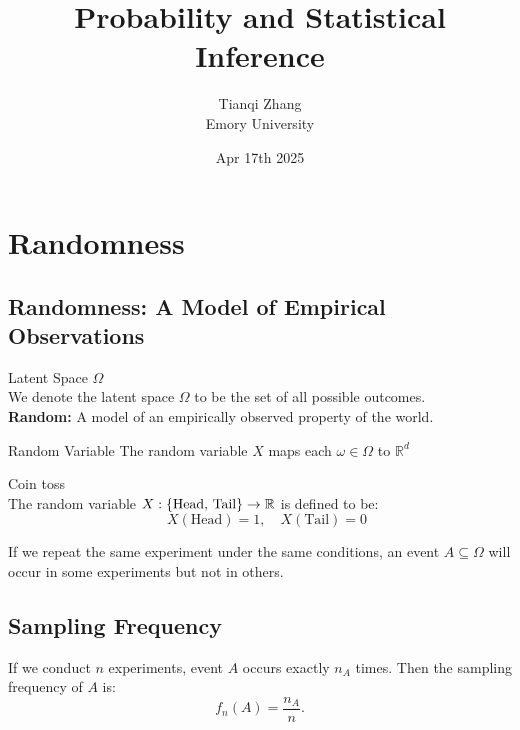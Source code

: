 

\title{\textbf{%
               Probability and Statistical Inference}}
\author{Tianqi Zhang\\
Emory University}
\date{Apr 17th 2025}



\maketitle
\setcounter{tocdepth}{1} %

\section{Randomness}

\subsection{Randomness: A Model of Empirical Observations}
\begin{df}{Latent Space $\Omega$}\\
	We denote the latent space $\Omega$ to be the set of all possible outcomes. \\
	\textbf{Random:} A model of an empirically observed property of the world.
\end{df}

\begin{df}{Random Variable}
The random variable $X$ maps each $\omega \in \Omega$ to $\mathbb{R}^d$
\end{df}

\begin{eg}{Coin toss}\\
The random variable $X: \qty{\text{Head, Tail}} \rightarrow {\mathbb{R}}$ is defined to be: 
$$\quad X(\text{Head}) = 1, \quad X(\text{Tail}) = 0$$
\end{eg}

\noindent If we repeat the same experiment under the same conditions, an event \(A \subseteq \Omega\) will occur in some experiments but not in others.

\subsection{Sampling Frequency}
If we conduct \(n\) experiments, event \(A\) occurs exactly \(n_A\) times. Then the sampling frequency of \(A\) is:
\[
f_n(A) = \frac{n_A}{n}.
\]

